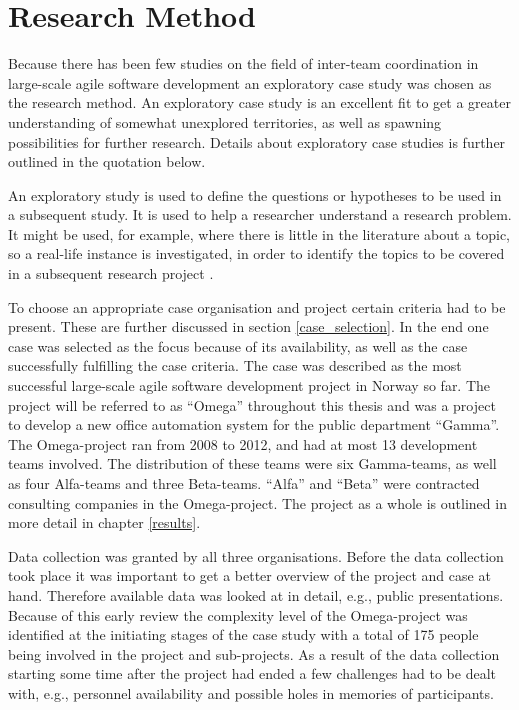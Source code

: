 \section{Research Method}

Because there has been few studies on the field of inter-team coordination in large-scale agile software development an exploratory case study was chosen as the research method. An exploratory case study is an excellent fit to get a greater understanding of somewhat unexplored territories, as well as spawning possibilities for further research. Details about exploratory case studies is further outlined in the quotation below.

\begin{fancyquotes}
An exploratory study is used to define the questions or hypotheses to be used in a subsequent study. It is used to help a researcher understand a research problem. It might be used, for example, where there is little in the literature about a topic, so a real-life instance is investigated, in order to identify the topics to be covered in a subsequent research project \cite{yin2009case}. 
\end{fancyquotes}

To choose an appropriate case organisation and project certain criteria had to be present. These are further discussed in section \ref{case_selection}. In the end one case was selected as the focus because of its availability, as well as the case successfully fulfilling the case criteria. The case was described as the most successful large-scale agile software development project in Norway so far. The project will be referred to as ``Omega'' throughout this thesis and was a project to develop a new office automation system for the public department ``Gamma''. The Omega-project ran from 2008 to 2012, and had at most 13 development teams involved. The distribution of these teams were six Gamma-teams, as well as four Alfa-teams and three Beta-teams. ``Alfa'' and ``Beta'' were contracted consulting companies in the Omega-project. The project as a whole is outlined in more detail in chapter \ref{results}.

Data collection was granted by all three organisations. Before the data collection took place it was important to get a better overview of the project and case at hand. Therefore available data was looked at in detail, e.g., public presentations. Because of this early review the complexity level of the Omega-project was identified at the initiating stages of the case study with a total of 175 people being involved in the project and sub-projects. As a result of the data collection starting some time after the project had ended a few challenges had to be dealt with, e.g., personnel availability and possible holes in memories of participants.

